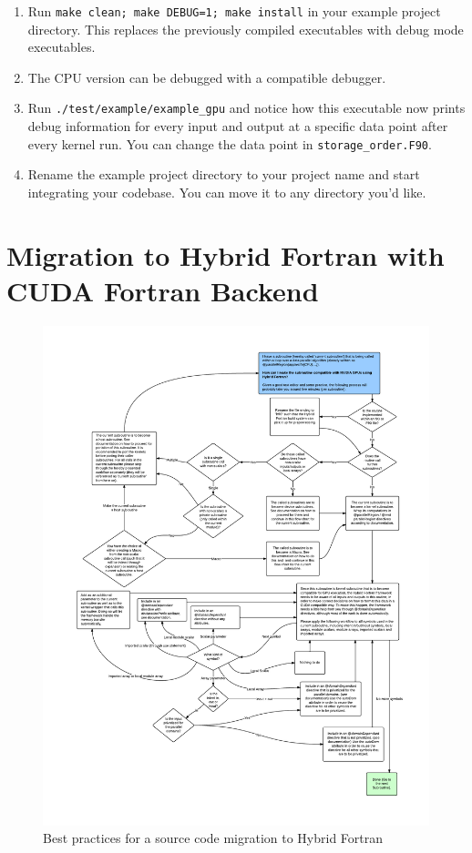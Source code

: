 \begin{enumerate}
 \item Run \verb|make clean; make DEBUG=1; make install| in your example project directory. This replaces the previously compiled executables with debug mode executables.
 \item The CPU version can be debugged with a compatible debugger.
 \item Run \verb|./test/example/example_gpu| and notice how this executable now prints debug information for every input and output at a specific data point after every kernel run. You can change the data point in \verb|storage_order.F90|.
 \item Rename the example project directory to your project name and start integrating your codebase. You can move it to any directory you'd like.
\end{enumerate}

\section{Migration to Hybrid Fortran with CUDA Fortran Backend}

\begin{figure}[hbtp]
  \centering  \includegraphics[width=16cm]{figures/HybridFortranGPUCompatibleCode.pdf}
  \caption [Best practices source code migration]{Best practices for a source code migration to Hybrid Fortran}
  \label{figure:bestPractMigration}
\end{figure}

